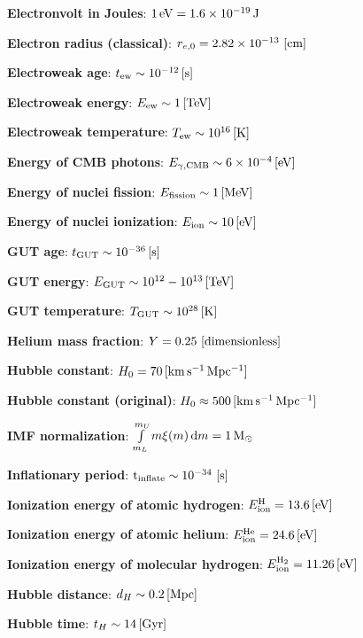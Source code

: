 \documentclass[a4paper,11pt]{article}
\begin{document}
{\noindent}\textbf{Electronvolt in Joules}: $1\,{\rm eV} = 1.6\times10^{-19}\,{\rm J}$

{\noindent}\textbf{Electron radius (classical)}: $r_{e,0}=2.82\times10^{-13} ~ [{\rm cm}]$

{\noindent}\textbf{Electroweak age}: $t_\mathrm{ew} \sim 10^{-12}\,[{\rm s}]$

{\noindent}\textbf{Electroweak energy}: $E_\mathrm{ew} \sim 1\,[{\rm TeV}]$

{\noindent}\textbf{Electroweak temperature}: $T_\mathrm{ew} \sim 10^{16}\,[{\rm K}]$

{\noindent}\textbf{Energy of CMB photons}: $E_{\gamma,\mathrm{CMB}} \sim 6\times10^{-4}\,[{\rm eV}]$

{\noindent}\textbf{Energy of nuclei fission}: $E_\mathrm{fission} \sim 1\,[{\rm MeV}]$

{\noindent}\textbf{Energy of nuclei ionization}: $E_\mathrm{ion} \sim 10\,[{\rm eV}]$

{\noindent}\textbf{GUT age}: $t_\mathrm{GUT} \sim 10^{-36}\,[{\rm s}]$

{\noindent}\textbf{GUT energy}: $E_\mathrm{GUT} \sim 10^{12}-10^{13}\,[{\rm TeV}]$

{\noindent}\textbf{GUT temperature}: $T_\mathrm{GUT} \sim 10^{28}\,[{\rm K}]$

{\noindent}\textbf{Helium mass fraction}: $Y = 0.25 ~ [{\rm dimensionless}]$

{\noindent}\textbf{Hubble constant}: $H_0 = 70\,[{\rm km\,s^{-1}\,Mpc^{-1}}]$

{\noindent}\textbf{Hubble constant (original)}: $H_0 \approx 500\,[{\rm km\,s^{-1}\,Mpc^{-1}}]$

{\noindent}\textbf{IMF normalization}: $\int\limits_{m_L}^{m_U} m\xi(m)\,\mathrm{d}m = 1\,{\rm M}_\odot$

{\noindent}\textbf{Inflationary period}: ${\rm t_\mathrm{inflate}}\sim10^{-34} ~ [{\rm s}]$

{\noindent}\textbf{Ionization energy of atomic hydrogen}: $E_\mathrm{ion}^\mathrm{H} = 13.6\,[{\rm eV}]$

{\noindent}\textbf{Ionization energy of atomic helium}: $E_\mathrm{ion}^\mathrm{He} = 24.6\,[{\rm eV}]$

{\noindent}\textbf{Ionization energy of molecular hydrogen}: $E_\mathrm{ion}^\mathrm{H_2} = 11.26\,[{\rm eV}]$

{\noindent}\textbf{Hubble distance}: $d_H \sim 0.2\,[{\rm Mpc}]$

{\noindent}\textbf{Hubble time}: $t_H \sim 14\,[{\rm Gyr}]$
\end{document}
